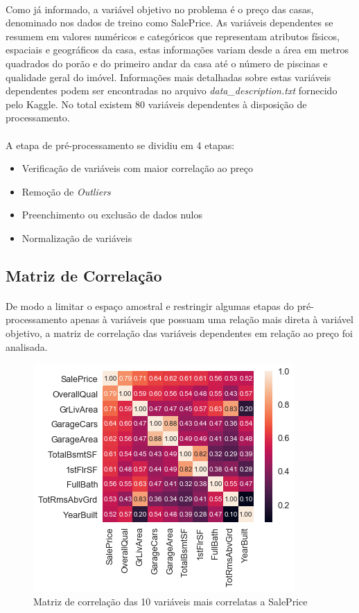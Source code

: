 \documentclass{article}
\begin{document}
	\paragraph{}Como já informado, a variável objetivo no problema é o preço das casas, denominado nos dados de treino como SalePrice. As variáveis dependentes se resumem em valores numéricos e categóricos que representam atributos físicos, espaciais e geográficos da casa, estas informações variam desde a área em metros quadrados do porão e do primeiro andar da casa até o número de piscinas e qualidade geral do imóvel. Informações mais detalhadas sobre estas variáveis dependentes podem ser encontradas no arquivo \textit{data\_description.txt} fornecido pelo Kaggle. No total existem 80 variáveis dependentes à disposição de processamento.
	
	\paragraph{}A etapa de pré-processamento se dividiu em 4 etapas:
	\begin{itemize}
		\item Verificação de variáveis com maior correlação ao preço
		\item Remoção de \textit{Outliers}
		\item Preenchimento ou exclusão de dados nulos
		\item Normalização de variáveis
	\end{itemize}
	
		\subsection{Matriz de Correlação}
		\paragraph{}De modo a limitar o espaço amostral e restringir algumas etapas do pré-processamento apenas à variáveis que possuam uma relação mais direta à variável objetivo, a matriz de correlação das variáveis dependentes em relação ao preço foi analisada.
		
		\begin{figure}[h]
			\centering
			\includegraphics[scale=0.9]{../img/correlation}
			\caption{Matriz de correlação das 10 variáveis mais correlatas a SalePrice}
		\end{figure}
		
\end{document}
